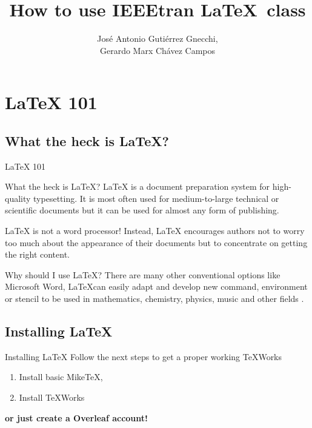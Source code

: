 \documentclass{beamer}
\title[How to use IEEEtran]{How to use IEEEtran \LaTeX\, class}
\author[Gerardo Marx]{
José Antonio Gutiérrez Gnecchi,\\
Gerardo Marx Chávez Campos}
\institute[Tec. Morelia]{Instituto Tecnológico de Morelia\\
Posgrado de electrónica}
\begin{document}
\begin{frame}
\titlepage
\end{frame}

\section{LaTeX 101}
\subsection{What the heck is LaTeX?}
\begin{frame}{\LaTeX{} 101}
\begin{block}{What the heck is \LaTeX?}
\LaTeX{} is a document preparation system for high-quality typesetting. It is most often used for medium-to-large technical or scientific documents but it can be used for almost any form of publishing.

\LaTeX{} is not a word processor! Instead, \LaTeX{} encourages authors not to worry too much about the appearance of their documents but to concentrate on getting the right content\cite{latexProject}.
\end{block}

\begin{block}{Why should I use \LaTeX?}
There are many other conventional options like Microsoft Word, \LaTeX can easily adapt and develop new command, environment or stencil to be used in mathematics, chemistry, physics, music and other fields \cite{guiaLatex2014}.
\end{block}
\end{frame}

\subsection{Installing \LaTeX}%
\begin{frame}{Installing \LaTeX}
Follow the next steps to get a proper working \TeX Works
\begin{enumerate}
\item Install basic Mike\TeX,
\item Install \TeX Works 
\end{enumerate}
\vspace{1cm}
\centering
\textbf{or just create a Overleaf account!}
\end{frame}

\end{document}

